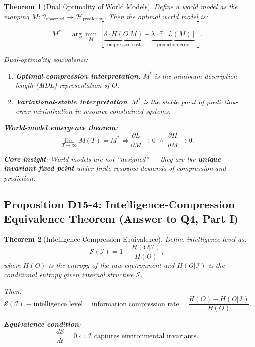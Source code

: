 \documentclass[12pt, a4paper]{article}
\newtheorem{theorem}{Theorem}[section]
\newcommand{\calI}{\mathcal{I}}
\newcommand{\calS}{\mathcal{S}}
\newcommand{\calH}{\mathcal{H}}
\newcommand{\calO}{\mathcal{O}}
\newcommand{\E}{\mathbb{E}}
\begin{document}
\begin{theorem}[Dual Optimality of World Models]\label{thm:world-model}
Define a world model as the mapping $M: \calO_{\text{observed}} \rightarrow \calH_{\text{prediction}}$. Then the optimal world model is:
\begin{equation}\label{eq:world-model-opt}
M^{*} = \arg\min_{M}\left[ \underbrace{\beta\cdot H(O|M)}_{\text{compression cost}} + \underbrace{\lambda\cdot \E[L(M)]}_{\text{prediction error}} \right].
\end{equation}

Dual-optimality equivalence:
\begin{enumerate}
\item \textbf{Optimal-compression interpretation}: $M^{*}$ is the minimum description length (MDL) representation of $O$.
\item \textbf{Variational-stable interpretation}: $M^{*}$ is the stable point of prediction-error minimization in resource-constrained systems.
\end{enumerate}

\noindent\textbf{World-model emergence theorem}:
\begin{equation}
\lim_{T\to\infty} M(T) = M^{*} \iff \frac{\partial L}{\partial M} \to 0 \;\land\; \frac{\partial H}{\partial M} \to 0.
\end{equation}

\noindent\textbf{Core insight}: World models are not ``designed'' --- they are the \textbf{unique invariant fixed point} under finite-resource demands of compression and prediction.
\end{theorem}

\subsection{Proposition D15-4: Intelligence-Compression Equivalence Theorem (Answer to Q4, Part I)}\label{sec:theorem4}

\begin{theorem}[Intelligence-Compression Equivalence]\label{thm:equivalence}
Define intelligence level as:
\begin{equation}\label{eq:intelligence-level}
\calS(\calI) = 1 - \frac{H(O|\calI)}{H(O)},
\end{equation}
where $H(O)$ is the entropy of the raw environment and $H(O|\calI)$ is the conditional entropy given internal structure $\calI$.

Then:
\begin{equation}
\calS(\calI) \equiv \text{intelligence level} = \text{information compression rate} = \frac{H(O) - H(O|\calI)}{H(O)}.
\end{equation}

\noindent\textbf{Equivalence condition}:
\begin{equation}
\frac{d\calS}{dt} = 0 \iff \calI \text{ captures environmental invariants}.
\end{equation}
\end{theorem}
\end{document}
